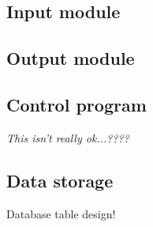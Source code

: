 

\subsection{Input module}

\subsection{Output module}

\subsection{Control program}

\textit{This isn't really ok...????}

\subsection{Data storage}\label{sec:res:data}

Database table design!


